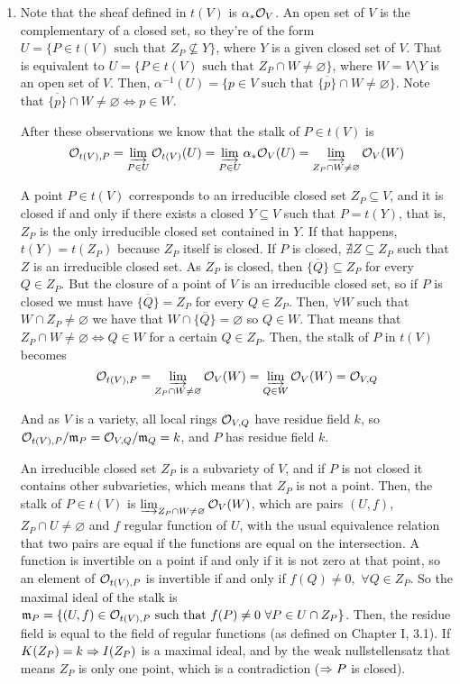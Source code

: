 \begin{sol}
	\begin{enumerate}[label=\alph*)]
		\item Note that the sheaf defined in $t(V)$ is $\alpha_*\mathcal{O}_V$. An open set of $V$ is the complementary of a closed set, so they're of the form $U = \{P \in t(V) \text{ such that } Z_P \not\subseteq Y \}$, where $Y$ is a given closed set of $V$. That is equivalent to $U = \{P \in t(V) \text{ such that } Z_P \cap W \neq \varnothing \}$, where $W = V \setminus Y$ is an open set of $V$. Then, $\alpha^{-1}(U) = \{p \in V \text{ such that } \overline{\{p\}} \cap W \neq \varnothing \}$. Note that $\overline{\{p\}} \cap W \neq \varnothing \iff p \in W$. 

		After these observations we know that the stalk of $P \in t(V)$ is 
		\[
			\mathcal{O}_{t(V),P} = \varinjlim_{P \in U} \mathcal{O}_{t(V)}(U) = \varinjlim_{P \in U} \alpha_* \mathcal{O}_{V}(U) = \varinjlim_{Z_P \cap W \neq \varnothing} \mathcal{O}_{V}(W)
		\]


		A point $P \in t(V)$ corresponds to an irreducible closed set $Z_P \subseteq V$, and it is closed if and only if there exists a closed $Y \subseteq V$ such that $P = t(Y)$, that is, $Z_P$ is the only irreducible closed set contained in $Y$. If that happens, $t(Y) = t(Z_P)$ because $Z_P$ itself is closed. If $P$ is closed, $\nexists Z \subseteq Z_P$ such that $Z$ is an irreducible closed set. As $Z_P$ is closed, then $\overline{\{Q\}} \subseteq Z_P$ for every $Q \in Z_P$. But the closure of a point of $V$ is an irreducible closed set, so if $P$ is closed we must have $\overline{\{Q\}} = Z_P$ for every $Q \in Z_P$. Then, $\forall W$ such that $W \cap Z_P \neq \varnothing$ we have that $W \cap \overline{\{Q\}} = \varnothing$ so $Q \in W$. That means that $Z_P \cap W \neq \varnothing \iff Q \in W$ for a certain $Q \in Z_P$. Then, the stalk of $P$ in $t(V)$ becomes 
		\[
			\mathcal{O}_{t(V),P} = \varinjlim_{Z_P \cap W \neq \varnothing} \mathcal{O}_{V}(W) = \varinjlim_{Q \in W} \mathcal{O}_{V}(W) = \mathcal{O}_{V,Q}
		\]

		And as $V$ is a variety, all local rings $\mathcal{O}_{V,Q}$ have residue field $k$, so $\mathcal{O}_{t(V),P} / \mathfrak{m}_P = \mathcal{O}_{V,Q}/\mathfrak{m}_Q = k$, and $P$ has residue field $k$.

		An irreducible closed set $Z_P$ is a subvariety of $V$, and if $P$ is not closed it contains other subvarieties, which means that $Z_P$ is not a point. Then, the stalk of $P \in t(V)$ is $\varinjlim_{Z_P \cap W \neq \varnothing} \mathcal{O}_{V}(W)$, which are pairs $(U,f)$, $Z_P \cap U \neq \varnothing$ and $f$ regular function of $U$, with the usual equivalence relation that two pairs are equal if the functions are equal on the intersection. A function is invertible on a point if and only if it is not zero at that point, so an element of $\mathcal{O}_{t(V),P}$ is invertible if and only if $f(Q) \neq 0, \, \, \forall Q \in Z_P$. So the maximal ideal of the stalk is $\mathfrak{m}_P =  \{(U,f) \in \mathcal{O}_{t(V),P} \text{ such that } f(P) \neq 0 \, \, \forall P \in U \cap Z_P \}$. Then, the residue field is equal to the field of regular functions (as defined on Chapter I, 3.1). If $K(Z_P) = k \Rightarrow I(Z_P)$ is a maximal ideal, and by the weak nullstellensatz that means $Z_P$ is only one point, which is a contradiction ($\Rightarrow P$ is closed).


\end{enumerate}
\end{sol}
